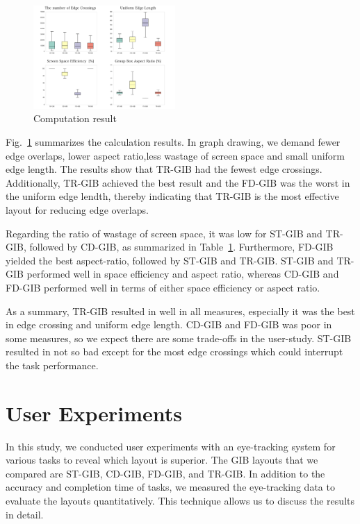 \documentclass{vgtc}                          %
\begin{document}
\begin{figure}[h]
  \begin{center}
    \includegraphics[width=0.48\textwidth]{pictures/computation.png}
    \caption{Computation result}
    \label{comp-result}
  \end{center}
\end{figure}

Fig.~\ref{comp-result} summarizes the calculation results.
In graph drawing, we demand fewer edge overlaps, lower aspect ratio,less wastage of screen space and small uniform edge length.
The results show that TR-GIB had the fewest edge crossings.
Additionally, TR-GIB achieved the best result and the FD-GIB was the worst in the uniform edge lendth, thereby indicating that TR-GIB is the most effective layout for reducing edge overlaps.

Regarding the ratio of wastage of screen space, it was low for ST-GIB and TR-GIB, followed by CD-GIB, as summarized in Table~\ref{comp-result}.
Furthermore, FD-GIB yielded the best aspect-ratio, followed by ST-GIB and TR-GIB.
ST-GIB and TR-GIB performed well in space efficiency and aspect ratio, whereas CD-GIB and FD-GIB performed well in terms of either space efficiency or aspect ratio.

As a summary, TR-GIB resulted in well in all measures, especially it was the best in edge crossing and uniform edge length.
CD-GIB and FD-GIB was poor in some measures, so we expect there are some trade-offs in the user-study.
ST-GIB resulted in not so bad except for the most edge crossings which could interrupt the task performance.

%
\section{User Experiments}
%
In this study, we conducted user experiments with an eye-tracking system for various tasks to reveal which layout is superior.
The GIB layouts that we compared are ST-GIB, CD-GIB, FD-GIB, and TR-GIB.
In addition to the accuracy and completion time of tasks, we measured the eye-tracking data to evaluate the layouts quantitatively.
This technique allows us to discuss the results in detail.
\end{document}

